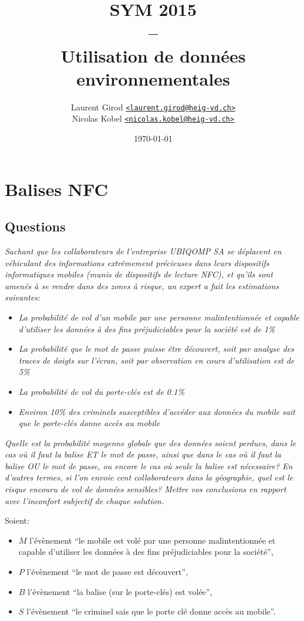 \documentclass[a4paper,11pt,titlepage]{article}
\title{SYM 2015\\--\\Utilisation de données environnementales}
\author{%
Laurent Girod \href{mailto:laurent.girod@heig-vd.ch}{\texttt{<laurent.girod@heig-vd.ch>}}\\%
Nicolas Kobel \href{mailto:nicolas.kobel@heig-vd.ch}{\texttt{<nicolas.kobel@heig-vd.ch>}}%
}
\date{\today}
\begin{document}
\maketitle{}
\section{Balises NFC}
\subsection*{Questions}
\textit{Sachant que les collaborateurs de l'entreprise UBIQOMP SA se déplacent en véhiculant des
informations extrêmement précieuses dans leurs dispositifs informatiques mobiles (munis de dispositifs de
lecture NFC), et qu'ils sont amenés à se rendre dans des zones à risque, un expert a fait les estimations
suivantes:}
\begin{itemize}
	\item \textit{La probabilité de vol d'un mobile par une personne malintentionnée et capable d'utiliser les
		données à des fins préjudiciables pour la société est de 1\%}
	\item \textit{La probabilité que le mot de passe puisse être découvert, soit par analyse des traces de doigts sur
		l'écran, soit par observation en cours d'utilisation est de 5\%}
	\item \textit{La probabilité de vol du porte-clés est de 0.1\%}
	\item \textit{Environ 10\% des criminels susceptibles d'accéder aux données du mobile sait que le porte-clés
		donne accès au mobile}
\end{itemize}

\textit{Quelle est la probabilité moyenne globale que des données soient perdues, dans le cas où il faut la
balise ET le mot de passe, ainsi que dans le cas où il faut la balise OU le mot de passe, ou encore le cas où
seule la balise est nécessaire? En d'autres termes, si l'on envoie cent collaborateurs dans la géographie,
quel est le risque encouru de vol de données sensibles? Mettre vos conclusions en rapport avec l'inconfort
subjectif de chaque solution.}

Soient:
\begin{itemize}
	\item $M$ l'évènement ``le mobile est volé par une personne malintentionnée et capable d'utiliser les données
		à des fins préjudiciables pour la société'',
	\item $P$ l'évènement ``le mot de passe est découvert'',
	\item $B$ l'évènement ``la balise (sur le porte-clés) est volée'',
	\item $S$ l'évènement ``le criminel sais que le porte clé donne accès au mobile''.
\end{itemize}
\end{document}
